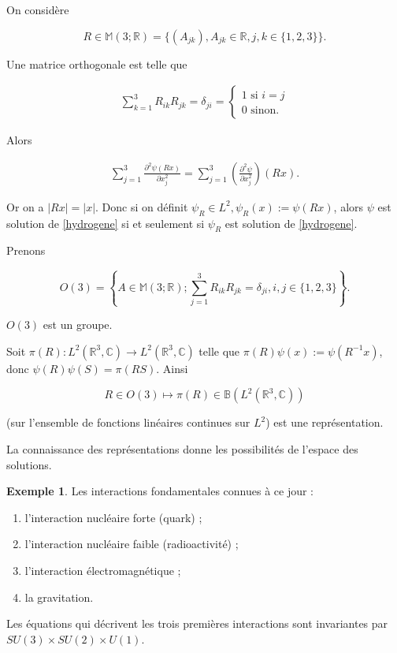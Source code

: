 \documentclass[french]{book}
\theoremstyle{definition}
\newtheorem*{protoexemple}{Exemple}
\newenvironment{exemple}
    {\colorlet{shadecolor}{gray!10}\begin{shaded}\begin{protoexemple}}
    {\end{protoexemple}\end{shaded}}
\begin{document}
On considère

\[R \in \mathbb{M}(3; \mathbb{R}) = \{ (A _{jk}), A _{jk} \in \mathbb{R}, j,k \in \{ 1, 2, 3 \}\}.\]

Une matrice orthogonale est telle que

\begin{gather*}
  \sum_{k=1}^{3} R _{ik} R _{jk} = \delta _{ji} = \begin{cases}
    1 \text{ si } i=j \\
    0 \text{ sinon. }
  \end{cases}
\end{gather*}

Alors

\begin{gather*}
  \sum_{j=1}^{3} \frac{\partial ^2 \psi(R x) }{\partial x_j ^2 }  = \sum_{j=1}^{3} \left(\frac{\partial ^2 \psi }{\partial x_j ^2} \right) (R x).
\end{gather*}

Or on a \(\left\lvert Rx \right\rvert = \left\lvert x \right\rvert\). Donc si on définit \(\psi_R \in L ^2, \psi_R(x):=\psi(Rx)\), alors \(\psi\) est solution de \ref{hydrogene} si et seulement si \(\psi_R\) est solution de \ref{hydrogene}.

Prenons

\[O(3) = \left\{ A \in \mathbb{M}(3;\mathbb{R}) ; \sum_{j=1}^{3} R _{ik} R _{jk} = \delta_{ji}, i,j \in \{ 1, 2, 3 \} \right\}.\]

\(O(3)\) est un groupe.

Soit \(\pi(R) : L ^2(\mathbb{R}^3, \mathbb{C}) \longrightarrow L ^2(\mathbb{R}^3, \mathbb{C})\) telle que \(\pi(R) \psi(x) := \psi(R ^{-1} x)\), donc \(\psi(R)\psi(S) = \pi(R S)\). Ainsi

\[R \in O(3) \longmapsto \pi(R) \in \mathbb{B}(L ^2(\mathbb{R}^3, \mathbb{C}))\]

(sur l'ensemble de fonctions linéaires continues sur \(L ^2\)) est une représentation.

La connaissance des représentations donne les possibilités de l'espace des solutions.

\begin{exemple}
  Les interactions fondamentales connues à ce jour :

  \begin{enumerate}
    \item l'interaction nucléaire forte (quark) ;
    \item l'interaction nucléaire faible (radioactivité) ;
    \item l'interaction électromagnétique ;
    \item la gravitation.
  \end{enumerate}

  Les équations qui décrivent les trois premières interactions sont invariantes par \(S U(3) \times S U (2) \times U (1)\).
\end{exemple}
\end{document}
